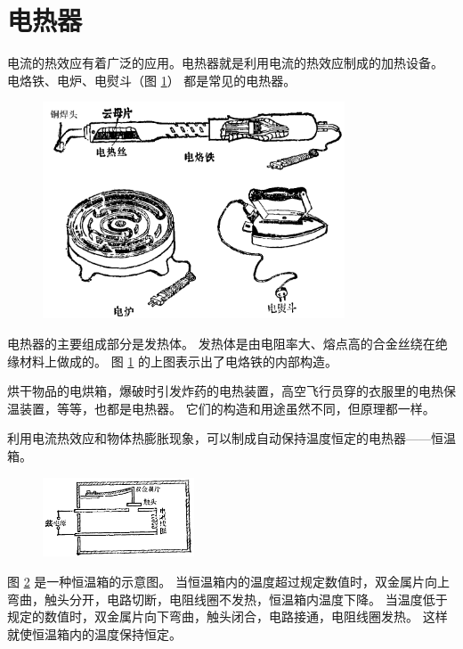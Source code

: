 \section{电热器}\label{sec:9-5}

电流的热效应有着广泛的应用。电热器就是利用电流的热效应制成的加热设备。
电烙铁、电炉、电熨斗（图 \ref{fig:9-6}） 都是常见的电热器。

\begin{figure}[htbp]
    \centering
    \includegraphics[width=0.8\textwidth]{../pic/czwl2-ch9-6}
    \caption{}\label{fig:9-6}
\end{figure}

电热器的主要组成部分是发热体。
发热体是由电阻率大、熔点高的合金丝绕在绝缘材料上做成的。
图 \ref{fig:9-6} 的上图表示出了电烙铁的内部构造。

烘干物品的电烘箱，爆破时引发炸药的电热装置，高空飞行员穿的衣服里的电热保温装置，等等，也都是电热器。
它们的构造和用途虽然不同，但原理都一样。

利用电流热效应和物体热膨胀现象，可以制成自动保持温度恒定的电热器——恒温箱。

\begin{figure}[htbp]
    \centering
    \includegraphics[width=0.4\textwidth]{../pic/czwl2-ch9-7}
    \caption{}\label{fig:9-7}
\end{figure}

图 \ref{fig:9-7} 是一种恒温箱的示意图。
当恒温箱内的温度超过规定数值时，双金属片向上弯曲，触头分开，电路切断，电阻线圈不发热，恒温箱内温度下降。
当温度低于规定的数值时，双金属片向下弯曲，触头闭合，电路接通，电阻线圈发热。
这样就使恒温箱内的温度保持恒定。

